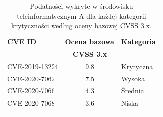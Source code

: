 \begin{table}[tbh]
\caption{Podatności wykryte w środowisku teleinformatycznym A dla każdej kategorii krytyczności według oceny bazowej CVSS 3.x.}
\begin{center}
\label{tab:wplyw:env_a:cve_cvss_3}
\begin{tabular}{lcl}
\hline \noalign {\smallskip}
\textbf{CVE ID}  & \textbf{Ocena bazowa} & \textbf{Kategoria}  \\
                 & \textbf{CVSS 3.x} &  \\
\hline \noalign {\smallskip}
CVE-2019-13224 & 9.8 & Krytyczna \\
CVE-2020-7062  & 7.5 & Wysoka \\
CVE-2020-7066  & 4.3 & Średnia \\
CVE-2020-7068  & 3.6 & Niska \\
\hline \noalign {\smallskip}
\end{tabular}
\end{center}
\end{table}

